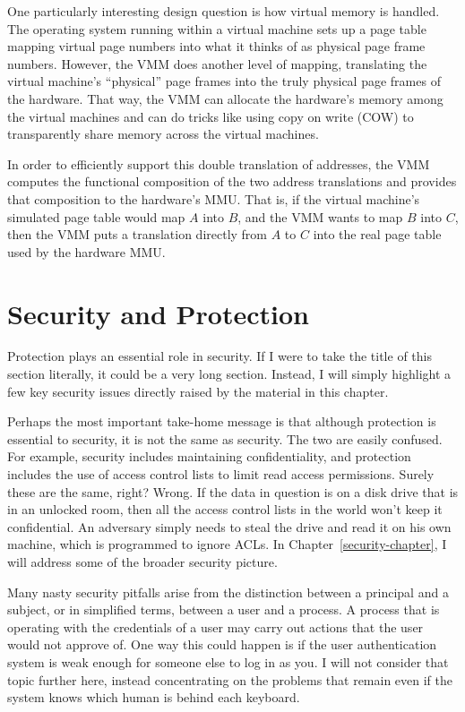 One particularly interesting design question is how virtual memory is
handled.  The operating system running within a virtual machine sets
up a page table mapping virtual page numbers into what it thinks of as
physical page frame numbers.  However, the VMM does another level of
mapping, translating the virtual machine's ``physical'' page frames
into the truly physical page frames of the hardware.  That way, the
VMM can allocate the hardware's memory among the virtual machines and
can do tricks like using copy on write (COW) to transparently share
memory across the virtual machines.

In order to efficiently support this double translation of addresses,
the VMM computes the functional composition of the two address
translations and provides that composition to the hardware's MMU.
That is, if the virtual machine's simulated page table would map $A$
into $B$, and the VMM wants to map $B$ into $C$, then the VMM puts a
translation directly from $A$ to $C$ into the real page table used by
the hardware MMU.

\section{Security and Protection}
\label{securityAndProtectionSection}
Protection plays an essential role in security.  If I were to take
the title of this section literally, it could be a very long section.
Instead, I will simply highlight a few key security issues directly
raised by the material in this chapter.

Perhaps the most important take-home message is that although
protection is essential to security, it is not the same as security.
The two are easily confused.  For example, security includes
maintaining confidentiality, and protection includes the use of access
control lists to limit read access permissions.  Surely these are the
same, right?  Wrong.  If the data in question is
on a disk drive that is in an unlocked room, then all the access
control lists in the world won't keep it confidential.  An adversary
simply needs to steal the drive and read it on his own machine, which
is programmed to ignore ACLs.  In Chapter~\ref{security-chapter}, I
will address some of the broader security picture.

Many nasty security pitfalls arise from the distinction between a
principal and a subject, or in simplified terms, between a
user and a process.  A process that is operating with the credentials
of a user may carry out actions that the user would not approve of.
One way this could happen is if the user authentication system is weak
enough for someone else to log in as you.  I will not consider that
topic further here, instead concentrating on the problems that remain
even if the system knows which human is behind each keyboard.

